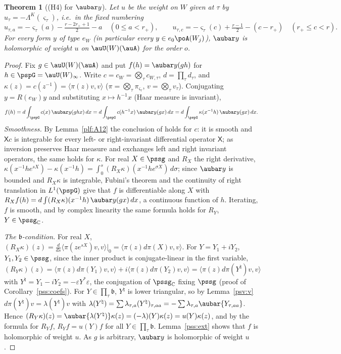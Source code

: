 \documentclass[10pt]{amsart}
\newtheorem{theorem}{Theorem}[section]
\theoremstyle{definition}
\theoremstyle{remark}
\newcommand{\C}{\mathbb C}
\begin{document}
\begin{theorem}[(H4) for $\aubar y$]\label{psv:ybar}
Let $u$ be the weight on $W$ given at $\tau$ by $u_\tau=-\Lambda^K(\varsigma_\tau)$, i.e.\ in the fixed numbering
\[
u_{\tau,a}=-\varsigma_\tau(a)-\tfrac{r-2r_++1}2-a\quad(0\le a<r_+),\qquad
u_{\tau,c}=-\varsigma_\tau(c)+\tfrac{r-1}2-(c-r_+)\quad(r_+\le c<r).
\]
For every form $y$ of type $e_W$ \textup(in particular every $y\in e_0\poA(W_j)$\textup), $\aubar y$ is holomorphic of
weight $u$ on $\auU(W)(\auA)$ for the order $o$.
\end{theorem}
\begin{proof}
Fix $g\in\auU(W)(\auA)$ and put $f(h)=\aubar y(gh)$ for $h\in\pspG=\auU(W)_\infty$. Write $c=c_W=\bigotimes_\tau c_{W,\tau}$,
$d=\prod_\tau d_\tau$, and $\kappa(z)=c(z^{-1})=\langle\pi(z)v,v\rangle$ ($\pi=\bigotimes_\tau\pi_{\varsigma_\tau}$, $v=\bigotimes_\tau v_\tau$).
Conjugating $y=R(e_W)y$ and substituting $x\mapsto h^{-1}x$ (Haar measure is invariant),
\[
f(h)=d\int_{\pspG}c(x)\,\aubar y(ghx)\,dx=d\int_{\pspG}c(h^{-1}x)\,\aubar y(gx)\,dx=d\int_{\pspG}\kappa(x^{-1}h)\,\aubar y(gx)\,dx .
\]
\emph{Smoothness.} By Lemma~\ref{plf:A12} the conclusion of {\cite[Theorem~3.2]{P49}} holds for $c$: it is smooth and
$\mathsf Xc$ is integrable for every left- or right-invariant differential operator $\mathsf X$; as inversion
preserves Haar measure and exchanges left and right invariant operators, the same holds for $\kappa$. For real
$X\in\pssg$ and $R_X$ the right derivative, $\kappa(x^{-1}he^{sX})-\kappa(x^{-1}h)=\int_0^s(R_X\kappa)(x^{-1}he^{\sigma X})\,
d\sigma$; since $\aubar y$ is bounded and $R_X\kappa$ is integrable, Fubini's theorem and the continuity of right
translation in $L^1(\pspG)$ give that $f$ is differentiable along $X$ with
$R_Xf(h)=d\int(R_X\kappa)(x^{-1}h)\,\aubar y(gx)\,dx$, a continuous function of $h$. Iterating, $f$ is smooth, and by
complex linearity the same formula holds for $R_Y$, $Y\in\pssg_\C$.

\emph{The $\mathfrak b$-condition.} For real $X$, $(R_X\kappa)(z)=\frac d{ds}\langle\pi(ze^{sX})v,v\rangle|_0=\langle\pi(z)d\pi(X)v,v\rangle$.
For $Y=Y_1+iY_2$, $Y_1,Y_2\in\pssg$, since the inner product is conjugate-linear in the first variable,
$(R_Y\kappa)(z)=\langle\pi(z)d\pi(Y_1)v,v\rangle+i\langle\pi(z)d\pi(Y_2)v,v\rangle=\langle\pi(z)d\pi(Y^\natural)v,v\rangle$ with
$Y^\natural=Y_1-iY_2=-\varepsilon Y^*\varepsilon$, the conjugation of $\pssg_\C$ fixing $\pssg$ (proof of
Corollary~\ref{pss:coefs}). For $Y\in\prod_\tau\mathfrak b$, $Y^\natural$ is lower triangular, so by Lemma~\ref{psv:v}
$d\pi(Y^\natural)v=\lambda(Y^\natural)v$ with $\lambda(Y^\natural)=\sum\lambda_{\tau,a}(Y^\natural)_{\tau,aa}=-\sum\lambda_{\tau,a}\aubar{Y_{\tau,aa}}$.
Hence $(R_Y\kappa)(z)=\aubar{\lambda(Y^\natural)}\kappa(z)=(-\lambda)(Y)\kappa(z)=u(Y)\kappa(z)$, and by the formula for $R_Yf$,
$R_Yf=u(Y)f$ for all $Y\in\prod_\tau\mathfrak b$. Lemma~\ref{pss:ext} shows that $f$ is holomorphic of weight $u$. As $g$ is
arbitrary, $\aubar y$ is holomorphic of weight $u$.
\end{proof}
\end{document}
